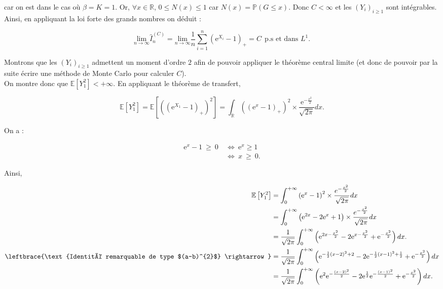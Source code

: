 \documentclass{article}
\theoremstyle{exostyle}
\newenvironment{questions}{
\begin{enumerate}[\hspace{12pt} 1.]}{\end{enumerate}}
\begin{document}
\begin{questions}
car on est dans le cas où $\beta = K = 1$. Or, $\forall x \in \mathbb{R}$, $0 \leq N(x) \leq 1$ car $N(x) = \mathbb{P} (G \leq x)$. Donc $C < \infty$ et les $(Y_{i})_{i \geq 1}$ sont intégrables.\\
Ainsi, en appliquant la loi forte des grands nombres on déduit : 

\[\underset{n \to \infty}{\text{lim}} \hat{I}_{n}^{(C)} = \underset{n \to \infty}{\text{lim}} \frac{1}{n} \sum_{i=1}^{n} \left( \text{e}^{X_{i}} - 1 \right)_{+} = C \ \ \text{p.s et dans $L^{1}$}.\]

Montrons que les $(Y_{i})_{i \geq 1}$ admettent un moment d'ordre $2$ afin de pouvoir appliquer le théorème central limite (et donc de pouvoir par la suite écrire une méthode de Monte Carlo pour calculer $C$).\\
On montre donc que $\mathbb{E}[Y_{1}^{2}] < + \infty$. En appliquant le théorème de transfert,

\[\mathbb{E}[Y_{1}^{2}] = \mathbb{E} \left[\left( \left( \text{e}^{X_{1}}-1 \right)_{+} \right)^{2} \right] = \int_{\mathbb{R}} \left( \left(\text{e}^{x}-1 \right)_{+} \right)^{2} \times \frac{\text{e}^{-\frac{x^{2}}{2}}}{\sqrt{2\pi}}dx.\]

On a :

\begin{align*}
    \text{e}^{x}-1 \ \geq \ 0 \ &\Leftrightarrow \ \text{e}^{x} \geq 1\\
    &\Leftrightarrow \ x \ \geq \ 0.
\end{align*}

Ainsi, 

\begin{align*}
    \mathbb{E}\left[ Y_{1}^{2} \right] &= \int_{0}^{+\infty} \left(\text{e}^{x}-1\right)^{2} \times \frac{e^{-\frac{x^{2}}{2}}}{\sqrt{2\pi}}dx\\
    &= \int_{0}^{+\infty}  \left(\text{e}^{2x}-2\text{e}^{x}+1\right) \times \frac{e^{-\frac{x^{2}}{2}}}{\sqrt{2\pi}} dx\\
    &= \frac{1}{\sqrt{2\pi}} \int_{0}^{+\infty} \left(\text{e}^{2x-\frac{x^{2}}{2}}-2\text{e}^{x-\frac{x^{2}}{2}}+\text{e}^{-\frac{x^{2}}{2}}\right)dx.\\
    \leftbrace{\text{Identité remarquable de type $(a-b)^{2}$} \rightarrow} &= \frac{1}{\sqrt{2\pi}} \int_{0}^{+\infty} \left( \text{e}^{-\frac{1}{2}\left(x-2\right)^{2}+2}-2\text{e}^{-\frac{1}{2}\left(x-1\right)^{2}+\frac{1}{2}}+\text{e}^{-\frac{x^{2}}{2}}\right)dx\\
    &=\frac{1}{\sqrt{2\pi}} \int_{0}^{+\infty} \left( \text{e}^{2}\text{e}^{-\frac{(x-2)^{2}}{2}} - 2\text{e}^{\frac{1}{2}}\text{e}^{-\frac{(x-1)^{2}}{2}} + \text{e}^{-\frac{x^{2}}{2}}\right)dx.
\end{align*}



\end{questions}
\end{document}

